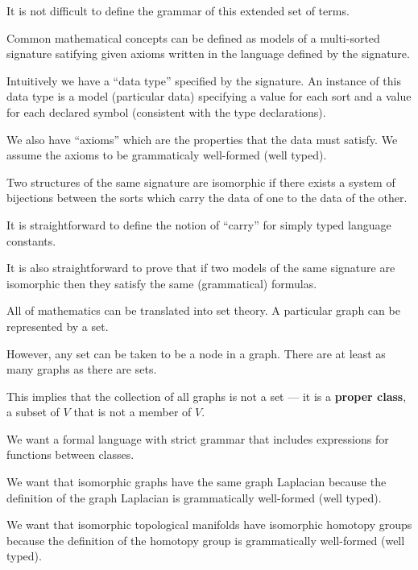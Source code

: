 {\vfill
It is not difficult to define the grammar of this extended set of terms.


Common mathematical concepts can be defined as models of a multi-sorted signature satifying given axioms written in the language defined
by the signature.

\vfill
Intuitively we have a ``data type'' specified by the signature.  An instance of this data type is a model
(particular data) specifying a value for each sort
and a value for each declared symbol (consistent with the type declarations).

\vfill
We also have ``axioms'' which are the properties that the data must satisfy.  We assume the axioms to be grammaticaly well-formed (well typed).


Two structures of the same signature are isomorphic if there exists a system of bijections between the sorts which carry the data of one to the data of the other.

\vfill
It is straightforward to define the notion of ``carry'' for simply typed language constants.

\vfill
It is also straightforward to prove that
if two models of the same signature are isomorphic then they satisfy the same (grammatical) formulas.


All of mathematics can be translated into set theory.  A particular graph can be represented by a set.

\vfill
However, any set can be taken to be a node in a graph. There are at least as many graphs as there are sets.

\vfill
This implies that the collection of all graphs is not a set --- it is a {\bf proper class}, a subset of $V$ that is not a member of $V$.


We want a formal language with strict grammar that includes expressions for functions between classes.

\vfill
We want that isomorphic graphs have the same graph Laplacian because the definition of the graph Laplacian is grammatically well-formed (well typed).

\vfill
We want that isomorphic topological manifolds have isomorphic homotopy groups because the definition of the homotopy group is grammatically well-formed (well typed).

}
